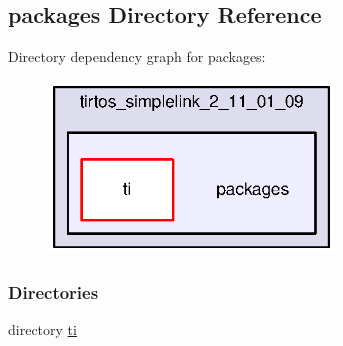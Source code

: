 \subsection{packages Directory Reference}
\label{dir_d1669b12cbe61e7239e718aeb01e04a5}
Directory dependency graph for packages\-:
\nopagebreak
\begin{figure}[H]
\begin{center}
\leavevmode
\includegraphics[width=215pt]{dir_d1669b12cbe61e7239e718aeb01e04a5_dep}
\end{center}
\end{figure}
\subsubsection*{Directories}
\begin{DoxyCompactItemize}
\item 
directory \hyperlink{dir_2a65440169f69d0c886a4ed0b4f15986}{ti}
\end{DoxyCompactItemize}
